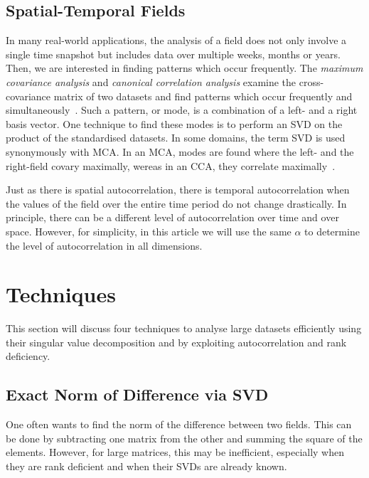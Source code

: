 \documentclass{acm_proc_article-sp}
\begin{document}
\subsection{Spatial-Temporal Fields}
\label{sec:Introduction Spatial-Temporal Fields}

In many real-world applications, the analysis of a field does not only involve a single time snapshot but includes data over multiple weeks, months or years. Then, we are interested in finding patterns which occur frequently. The \textit{maximum covariance analysis} and \textit{canonical correlation analysis} examine the cross-covariance matrix of two datasets and find patterns which occur frequently and simultaneously~\cite{Eshel2011, Storch1999}. Such a pattern, or mode, is a combination of a left- and a right basis vector. One technique to find these modes is to perform an SVD on the product of the standardised datasets. In some domains, the term SVD is used synonymously with MCA. In an MCA, modes are found where the left- and the right-field covary maximally, wereas in an CCA, they correlate maximally~\cite{Bretherton1992}.

Just as there is spatial autocorrelation, there is temporal autocorrelation when the values of the field over the entire time period do not change drastically. In principle, there can be a different level of autocorrelation over time and over space. %
However, for simplicity, in this article we will use the same $\alpha$ to determine the level of autocorrelation in all dimensions.

\section{Techniques}
\label{Techniques}

This section will discuss four techniques to analyse large datasets efficiently using their singular value decomposition and by exploiting autocorrelation and rank deficiency.

\subsection{Exact Norm of Difference via SVD}
\label{sec:Techniques Exact Norm of Difference via SVD}

One often wants to find the norm of the difference between two fields. This can be done by subtracting one matrix from the other and summing the square of the elements. However, for large matrices, this may be inefficient, especially when they are rank deficient and when their SVDs are already known.
\end{document}
